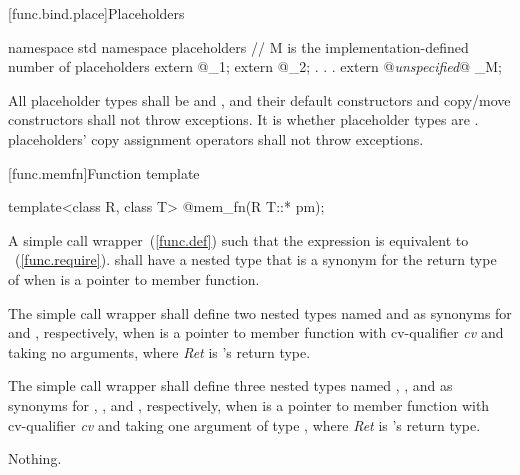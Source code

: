 [func.bind.place]{Placeholders}

%
%
\begin{codeblock}
namespace std {
  namespace placeholders {
    // M is the implementation-defined number of placeholders
    extern @\unspec@ _1;
    extern @\unspec@ _2;
                .
                .
                .
    extern @\textit{unspecified}@ _M;
  }
}
\end{codeblock}

\pnum
All placeholder types shall be  and
, and their default constructors and copy/move
constructors shall not throw exceptions. It is  whether
placeholder types are .  placeholders' copy
assignment operators shall not throw exceptions.%
%

[func.memfn]{Function template }%

%
\begin{itemdecl}
template<class R, class T> @\unspec@ mem_fn(R T::* pm);
\end{itemdecl}

\begin{itemdescr}
\pnum
\returns A simple call wrapper~(\ref{func.def}) 
such that the expression  is equivalent
to ~(\ref{func.require}).
 shall have a nested type  that is a synonym
for the return type of  when  is a pointer to
member function.

\pnum
The simple call wrapper shall
define two nested types named  and  as synonyms
for  and , respectively,
when  is
a pointer to member function with cv-qualifier \textit{cv} and taking no
arguments, where \textit{Ret} is 's return type.

\pnum
The simple call wrapper shall
define three nested types named ,
, and  as synonyms
for , , and , respectively,
when  is
a pointer to member function with cv-qualifier \textit{cv} and taking
one argument of type , where \textit{Ret} is 's return type.

\pnum
\throws Nothing.
\end{itemdescr}

